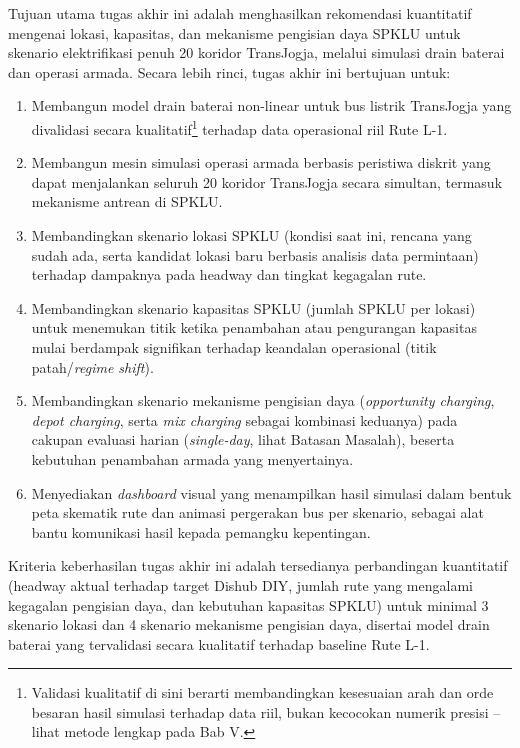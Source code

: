 Tujuan utama tugas akhir ini adalah menghasilkan rekomendasi kuantitatif
mengenai lokasi, kapasitas, dan mekanisme pengisian daya SPKLU untuk skenario
elektrifikasi penuh 20 koridor TransJogja, melalui simulasi drain baterai dan
operasi armada. Secara lebih rinci, tugas akhir ini bertujuan untuk:
\begin{enumerate}
	\item Membangun model drain baterai non-linear untuk bus listrik TransJogja
	yang divalidasi secara kualitatif\footnote{Validasi kualitatif di sini
	berarti membandingkan kesesuaian arah dan orde besaran hasil simulasi
	terhadap data riil, bukan kecocokan numerik presisi -- lihat metode
	lengkap pada Bab V.} terhadap data operasional riil Rute L-1.
	\item Membangun mesin simulasi operasi armada berbasis peristiwa diskrit
	yang dapat menjalankan seluruh 20 koridor TransJogja secara simultan,
	termasuk mekanisme antrean di SPKLU.
	\item Membandingkan skenario lokasi SPKLU (kondisi saat ini, rencana yang
	sudah ada, serta kandidat lokasi baru berbasis analisis data permintaan)
	terhadap dampaknya pada headway dan tingkat kegagalan rute.
	\item Membandingkan skenario kapasitas SPKLU (jumlah SPKLU per lokasi) untuk
	menemukan titik ketika penambahan atau pengurangan kapasitas mulai
	berdampak signifikan terhadap keandalan operasional (titik patah/\textit{regime
		shift}).
	\item Membandingkan skenario mekanisme pengisian daya (\textit{opportunity
		charging}, \textit{depot charging}, serta \textit{mix charging} sebagai
	kombinasi keduanya) pada cakupan evaluasi harian (\textit{single-day},
	lihat Batasan Masalah), beserta kebutuhan penambahan armada yang menyertainya.
	\item Menyediakan \textit{dashboard} visual yang menampilkan hasil simulasi dalam bentuk
	peta skematik rute dan animasi pergerakan bus per skenario, sebagai alat
	bantu komunikasi hasil kepada pemangku kepentingan.
\end{enumerate}

Kriteria keberhasilan tugas akhir ini adalah tersedianya perbandingan
kuantitatif (headway aktual terhadap target Dishub DIY, jumlah rute yang
mengalami kegagalan pengisian daya, dan kebutuhan kapasitas SPKLU) untuk
minimal 3 skenario lokasi dan 4 skenario mekanisme pengisian daya, disertai
model drain baterai yang tervalidasi secara kualitatif terhadap baseline
Rute L-1.

